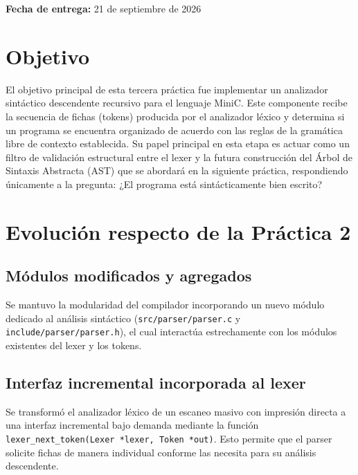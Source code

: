 \documentclass[12pt, letterpaper]{article}
\begin{document}
\begin{titlepage}
    \vfill
    
    {\large\textbf{Fecha de entrega:} 21 de septiembre de 2026 \par}
    
\end{titlepage}

\newpage
\tableofcontents
\newpage

\section{Objetivo}
El objetivo principal de esta tercera práctica fue implementar un analizador sintáctico descendente recursivo para el lenguaje MiniC. Este componente recibe la secuencia de fichas (tokens) producida por el analizador léxico y determina si un programa se encuentra organizado de acuerdo con las reglas de la gramática libre de contexto establecida. Su papel principal en esta etapa es actuar como un filtro de validación estructural entre el lexer y la futura construcción del Árbol de Sintaxis Abstracta (AST) que se abordará en la siguiente práctica, respondiendo únicamente a la pregunta: ¿El programa está sintácticamente bien escrito?

\section{Evolución respecto de la Práctica 2}

\subsection{Módulos modificados y agregados}
Se mantuvo la modularidad del compilador incorporando un nuevo módulo dedicado al análisis sintáctico (\texttt{src/parser/parser.c} y \texttt{include/parser/parser.h}), el cual interactúa estrechamente con los módulos existentes del lexer y los tokens.

\subsection{Interfaz incremental incorporada al lexer}
Se transformó el analizador léxico de un escaneo masivo con impresión directa a una interfaz incremental bajo demanda mediante la función \texttt{lexer\_next\_token(Lexer *lexer, Token *out)}. Esto permite que el parser solicite fichas de manera individual conforme las necesita para su análisis descendente.
\end{document}
